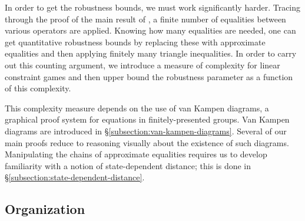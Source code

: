 
In order to get the robustness bounds, we must work significantly harder. Tracing through the proof of the main result of \cite{cleve2016perfect}, a finite number of equalities between various operators are applied. Knowing how many equalities are needed, one can get quantitative robustness bounds by replacing these with approximate equalities and then applying finitely many triangle inequalities. In order to carry out this counting argument, we introduce a measure of complexity for linear constraint games and then upper bound the robustness parameter as a function of this complexity.

This complexity measure depends on the use of van Kampen diagrams, a graphical proof system for equations in finitely-presented groups. Van Kampen diagrams are introduced in \S \ref{subsection:van-kampen-diagrams}. Several of our main proofs reduce to reasoning visually about the existence of such diagrams.
Manipulating the chains of approximate equalities requires us to develop familiarity with a notion of state-dependent distance; this is done in \S \ref{subsection:state-dependent-distance}.



\tocless\subsection{Organization}

